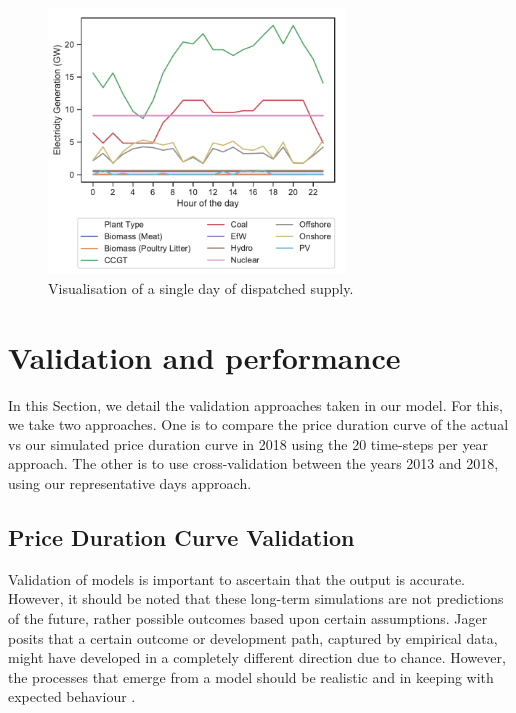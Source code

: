 \begin{figure}
	\centering
	\includegraphics[width=0.7\textwidth]{Chapter4/figures/e-Energy-2020/methods_and_materials/clusters_results_single_day.pdf}
	\caption{Visualisation of a single day of dispatched supply.}
	\label{fig:single_dispatched_day}
\end{figure}







\section{Validation and performance}
\label{elecsim:sec:validation}

In this Section, we detail the validation approaches taken in our model. For this, we take two approaches. One is to compare the price duration curve of the actual vs our simulated price duration curve in 2018 using the 20 time-steps per year approach. The other is to use cross-validation between the years 2013 and 2018, using our representative days approach.


\subsection{Price Duration Curve Validation}

Validation of models is important to ascertain that the output is accurate. However, it should be noted that these long-term simulations are not predictions of the future, rather possible outcomes based upon certain assumptions. Jager posits that a certain outcome or development path, captured by empirical data, might have developed in a completely different direction due to chance. However, the processes that emerge from a model should be realistic and in keeping with expected behaviour \cite{Jager2006a}.

